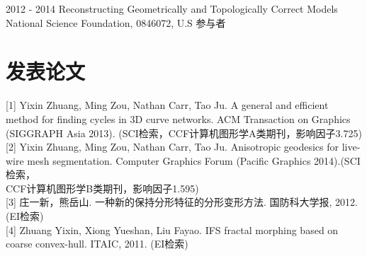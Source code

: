 \documentclass[20pt]{article} %
\begin{document}
\job
{2012 - }{2014}
{Reconstructing Geometrically and Topologically Correct Models}
{National Science Foundation, 0846072, U.S}
{参与者}

\section{发表论文}

[1]   Yixin Zhuang, Ming Zou, Nathan Carr, Tao Ju. {A general and efficient method for finding cycles in 3D curve networks}. ACM Transaction on Graphics (SIGGRAPH Asia 2013). (SCI检索，CCF计算机图形学A类期刊，影响因子3.725)\\%


[2] Yixin Zhuang, Ming Zou, Nathan Carr, Tao Ju. {Anisotropic geodesics for live-wire mesh segmentation}. Computer Graphics Forum (Pacific Graphics 2014).(SCI检索，\\CCF计算机图形学B类期刊，影响因子1.595)\\%


[3]   庄一新，熊岳山. 一种新的保持分形特征的分形变形方法. 国防科大学报, 2012. (EI检索)\\


[4]   Zhuang Yixin, Xiong Yueshan, Liu Fayao. IFS fractal morphing based on coarse convex-hull. ITAIC, 2011. (EI检索)

%
%
%
\end{document}
